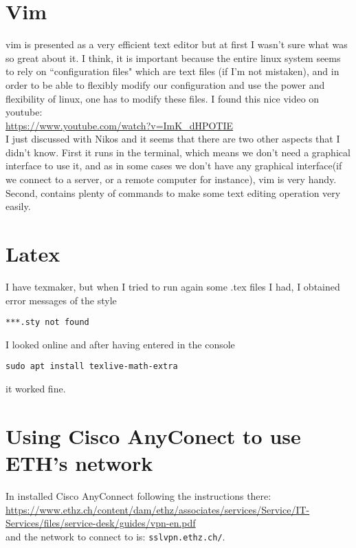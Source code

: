\documentclass[11pt,a4paper]{article} %
\begin{document}
\section{Vim}
vim is presented as a very efficient text editor but at first I wasn't sure what was so great about it. I think, it is important because the entire linux system seems to rely on ``configuration files" which are text files (if I'm not mistaken), and in order to be able to flexibly modify our configuration and use the power and flexibility of linux, one has to modify these files. I found this nice video on youtube:\\
\url{https://www.youtube.com/watch?v=ImK_dHPOTIE}\\
I just discussed with Nikos and it seems that there are two other aspects that I didn't know. First it runs in the terminal, which means we don't need a graphical interface to use it, and as in some cases we don't have any graphical interface(if we connect to a server, or a remote computer for instance), vim is very handy. Second, contains plenty of commands to make some text editing operation very easily.

\section{Latex}
I have texmaker, but when I tried to run again some .tex files I had, I obtained error messages of the style
\begin{verbatim}
***.sty not found
\end{verbatim}
I looked online and after having entered in the console
\begin{verbatim}
sudo apt install texlive-math-extra
\end{verbatim}
it worked fine.

\section{Using Cisco AnyConect to use ETH's network}
In installed Cisco AnyConnect following the instructions there:\\
\url{https://www.ethz.ch/content/dam/ethz/associates/services/Service/IT-Services/files/service-desk/guides/vpn-en.pdf}\\
and the network to connect to is: \texttt{sslvpn.ethz.ch/}.
\end{document}
